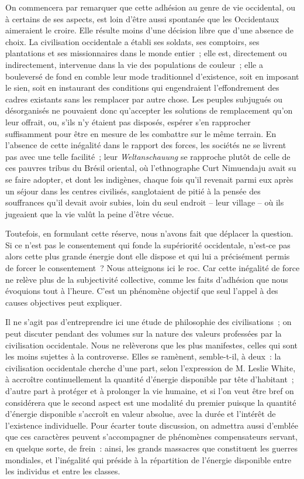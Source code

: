 \documentclass[french,twoside]{book} %
\begin{document}
On commencera par remarquer que cette adhésion au genre de vie occidental, ou à certains de ses aspects, est loin d’être aussi spontanée que les Occidentaux aimeraient le croire. Elle résulte moins d’une décision libre que d’une absence de choix. La civilisation occidentale a établi ses soldats, ses comptoirs, ses plantations et ses missionnaires dans le monde entier ; elle est, directement ou indirectement, intervenue dans la vie des populations de couleur ; elle a bouleversé de fond en comble leur mode traditionnel d’existence, soit en imposant le sien, soit en instaurant des conditions qui engendraient l’effondrement des cadres existants sans les remplacer par autre chose. Les peuples subjugués ou désorganisés ne pouvaient donc qu’accepter les solutions de remplacement qu’on leur offrait, ou, s’ils n’y étaient pas disposés, espérer s’en rapprocher suffisamment pour être en mesure de les combattre sur le même terrain. En l’absence de cette inégalité dans le rapport des forces, les sociétés ne se livrent pas avec une telle facilité ; leur \emph{Weltanschauung} se rapproche plutôt de celle de ces pauvres tribus du Brésil oriental, où l’ethnographe Curt Nimuendaju avait su se faire adopter, et dont les indigènes, chaque fois qu’il revenait parmi eux après un séjour dans les centres civilisés, sanglotaient de pitié à la pensée des souffrances qu’il devait avoir subies, loin du seul endroit – leur village – où ils jugeaient que la vie valût la peine d’être vécue.\par
Toutefois, en formulant cette réserve, nous n’avons fait que déplacer la question. Si ce n’est pas le consentement qui fonde la supériorité occidentale, n’est-ce pas alors cette plus grande énergie dont elle dispose et qui lui a précisément permis de forcer le consentement ? Nous atteignons ici le roc. Car cette inégalité de force ne relève plus de la subjectivité collective, comme les faits d’adhésion que nous évoquions tout à l’heure. C’est un phénomène objectif que seul l’appel à des causes objectives peut expliquer.\par
Il ne s’agit pas d’entreprendre ici une étude de philosophie des civilisations ; on peut discuter pendant des volumes sur la nature des valeurs professées par la civilisation occidentale. Nous ne relèverons que les plus manifestes, celles qui sont les moins sujettes à la controverse. Elles se ramènent, semble-t-il, à deux : la civilisation occidentale cherche d’une part, selon l’expression de M. Leslie White, à accroître continuellement la quantité d’énergie disponible par tête d’habitant ; d’autre part à protéger et à prolonger la vie humaine, et si l’on veut être bref on considérera que le second aspect est une modalité du premier puisque la quantité d’énergie disponible s’accroît en valeur absolue, avec la durée et l’intérêt de l’existence individuelle. Pour écarter toute discussion, on admettra aussi d’emblée que ces caractères peuvent s’accompagner de phénomènes compensateurs servant, en quelque sorte, de frein : ainsi, les grands massacres que constituent les guerres mondiales, et l’inégalité qui préside à la répartition de l’énergie disponible entre les individus et entre les classes.\par
\end{document}
